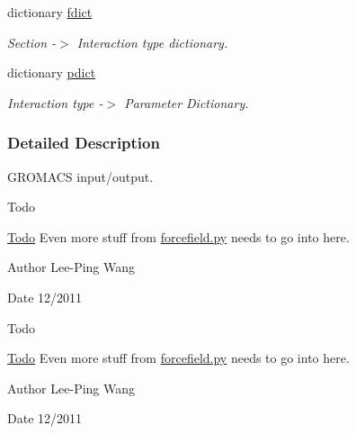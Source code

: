 \begin{DoxyCompactItemize}
dictionary \hyperlink{namespaceforcebalance_1_1gmxio_a179cbde2e55b4c025af89b225612d6e1}{fdict}
\begin{DoxyCompactList}\small\item\em Section -\/$>$ Interaction type dictionary. \end{DoxyCompactList}\item 
dictionary \hyperlink{namespaceforcebalance_1_1gmxio_ae845e0b923ecde16c79f2742b94534a6}{pdict}
\begin{DoxyCompactList}\small\item\em Interaction type -\/$>$ Parameter Dictionary. \end{DoxyCompactList}\end{DoxyCompactItemize}


\subsubsection{Detailed Description}
G\-R\-O\-M\-A\-C\-S input/output. \begin{DoxyRefDesc}{Todo}
\item[\hyperlink{todo__todo000009}{Todo}]Even more stuff from \hyperlink{forcefield_8py}{forcefield.\-py} needs to go into here.\end{DoxyRefDesc}


\begin{DoxyAuthor}{Author}
Lee-\/\-Ping Wang 
\end{DoxyAuthor}
\begin{DoxyDate}{Date}
12/2011
\end{DoxyDate}
\begin{DoxyRefDesc}{Todo}
\item[\hyperlink{todo__todo000012}{Todo}]Even more stuff from \hyperlink{forcefield_8py}{forcefield.\-py} needs to go into here.\end{DoxyRefDesc}


\begin{DoxyAuthor}{Author}
Lee-\/\-Ping Wang 
\end{DoxyAuthor}
\begin{DoxyDate}{Date}
12/2011 
\end{DoxyDate}


